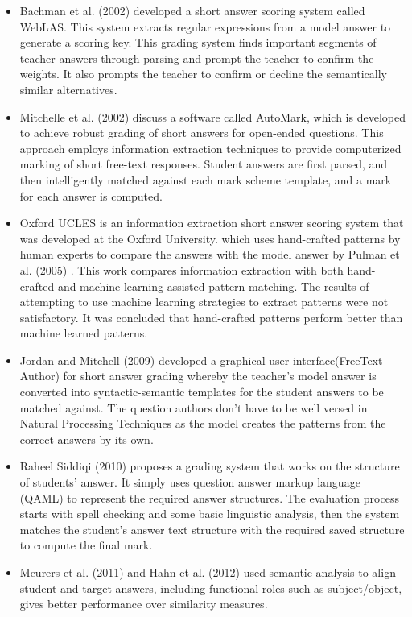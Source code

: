 \documentclass[rnd]{mas_proposal}
\begin{document}
\begin{itemize} 

	\item Bachman et al. (2002) \cite{Bachman2002} developed a short answer scoring system called WebLAS.  This system extracts regular expressions from a model answer to generate a scoring key. This grading system finds important segments of teacher answers through parsing and prompt the teacher to confirm the weights. It also prompts the teacher to confirm or decline the semantically similar alternatives.
	\item Mitchelle et al. (2002) \cite{Mitchell2002} discuss a software called AutoMark, which is developed to achieve robust grading of short answers for open-ended questions. This approach employs information extraction techniques to provide computerized marking of short free-text responses. Student answers are first parsed, and then intelligently matched against each mark scheme template, and a mark for each answer is computed. 
	\item Oxford UCLES is an information extraction short answer scoring system that was developed at the Oxford University.  which uses hand-crafted patterns by human experts to compare the answers with the model answer by Pulman et al. (2005) \cite{Pulman2005}. This work compares information extraction with both hand-crafted and machine learning assisted pattern matching.  The results of attempting to use machine learning strategies to extract patterns were not satisfactory.  It was concluded that hand-crafted patterns perform better than machine learned patterns. 
	\item Jordan and Mitchell (2009) \cite{Jordan2009} developed a graphical user interface(FreeText Author) for short answer grading whereby the teacher’s model answer is converted into syntactic-semantic templates for the student answers to be matched against. The question authors don’t have to be well versed in Natural Processing Techniques as the model creates the patterns from the correct answers by its own.
	\item Raheel Siddiqi (2010)\cite{Siddiqi2010} proposes a grading system that works on the structure of students' answer. It simply uses question answer markup language (QAML) to represent the required answer structures. The evaluation process starts with spell checking and some basic linguistic analysis, then the system matches the student’s answer text structure with the required saved structure to compute the final mark.
	\item Meurers et al. (2011) \cite{Meurers2011} and Hahn et al. (2012) \cite{Hahn2012} used semantic analysis to align student and target answers, including functional roles such as subject/object, gives better performance over similarity measures.

\end{itemize}
\end{document}
